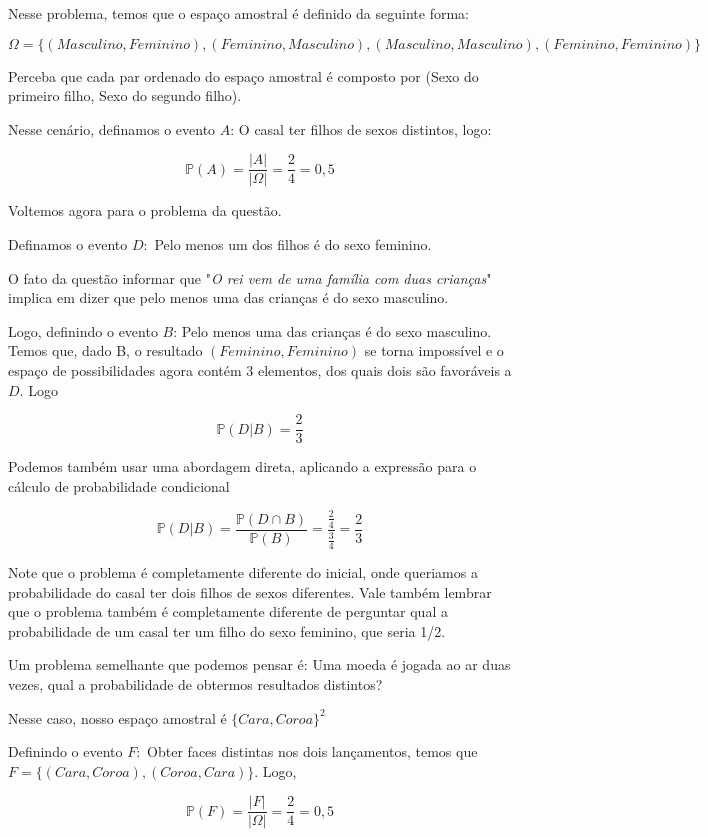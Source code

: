 \documentclass[12pt]{article}
\begin{document}
Nesse problema, temos que o espaço amostral é definido da seguinte forma:

\small{$$\Omega = \{(Masculino, Feminino), (Feminino, Masculino), (Masculino, Masculino), (Feminino, Feminino)\}$$}

Perceba que cada par ordenado do espaço amostral é composto por (Sexo do primeiro filho, Sexo do segundo filho).

Nesse cenário, definamos o evento $A$: O casal ter filhos de sexos distintos, logo:

$$\mathds{P}(A) = \dfrac{|A|}{|\Omega|} = \dfrac{2}{4} = 0,5$$


Voltemos agora para o problema da questão. 


Definamos o evento $D:$ Pelo menos um dos filhos é do sexo feminino. 


O fato da questão informar que "\textit{O rei vem de uma família com duas crianças}" implica em dizer que 
pelo menos uma das crianças é do sexo masculino. 

Logo, definindo o evento $B$: Pelo menos uma das crianças é do sexo masculino. Temos que, dado B, o resultado $(Feminino, Feminino)$ se torna impossível e o espaço de possibilidades
agora contém 3 elementos, dos quais dois são favoráveis a $D$. Logo

$$\mathds{P}(D|B) = \dfrac{2}{3}$$

Podemos também usar uma abordagem direta, aplicando a expressão para o cálculo de probabilidade condicional

$$\mathds{P}(D|B) = \dfrac{\mathds{P}(D \cap B)}{\mathds{P}(B)} = \dfrac{\frac{2}{4}}{\frac{3}{4}} = \dfrac{2}{3}$$


Note que o problema é completamente diferente do inicial, onde queriamos a probabilidade do casal ter dois filhos de sexos diferentes. Vale também lembrar 
que o problema também é completamente diferente de perguntar qual a probabilidade de um casal ter um filho do sexo feminino, que seria 1/2. 

Um problema semelhante que podemos pensar é: Uma moeda é jogada ao ar duas vezes, qual a probabilidade de obtermos resultados distintos?

Nesse caso, nosso espaço amostral é $\{Cara, Coroa\}^2$

Definindo o evento $F:$ Obter faces distintas nos dois lançamentos, temos que $F=\{(Cara, Coroa), (Coroa, Cara)\}$. Logo, 

$$\mathds{P}(F) = \dfrac{|F|}{|\Omega|} = \dfrac{2}{4} = 0,5$$
\end{document}
